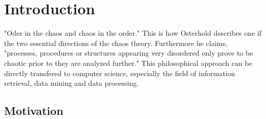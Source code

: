 \chapter{Introduction\label{cha:chapter1}}


"Oder in the chaos and chaos in the order." This is how Osterhold describes one if the two essential directions of the chaos theory. Furthermore he claims, "processes, procedures or structures appearing very disordered only prove to be chaotic prior to they are analyzed further." This philosophical approach can be directly transfered to computer science, especially the field of information retrieval, data mining and data processing. 

\section{Motivation\label{sec:moti}}


